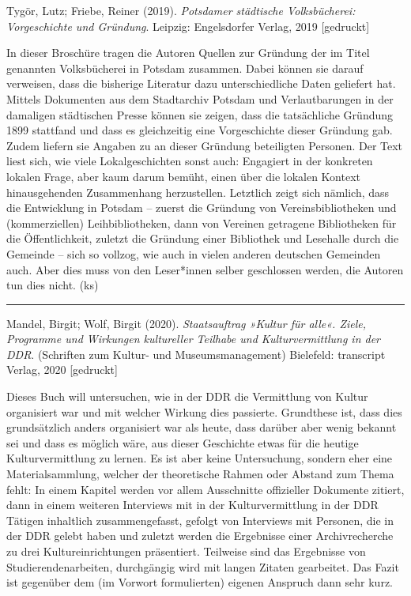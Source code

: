 \documentclass[a4paper,
fontsize=11pt,
oneside,
numbers=noperiodatend,
parskip=half-,
bibliography=totoc,
final
]{scrartcl}
\begin{document}
Tygör, Lutz; Friebe, Reiner (2019). \emph{Potsdamer städtische
Volksbücherei: Vorgeschichte und Gründung}. Leipzig: Engelsdorfer
Verlag, 2019 {[}gedruckt{]}

In dieser Broschüre tragen die Autoren Quellen zur Gründung der im Titel
genannten Volksbücherei in Potsdam zusammen. Dabei können sie darauf
verweisen, dass die bisherige Literatur dazu unterschiedliche Daten
geliefert hat. Mittels Dokumenten aus dem Stadtarchiv Potsdam und
Verlautbarungen in der damaligen städtischen Presse können sie zeigen,
dass die tatsächliche Gründung 1899 stattfand und dass es gleichzeitig
eine Vorgeschichte dieser Gründung gab. Zudem liefern sie Angaben zu an
dieser Gründung beteiligten Personen. Der Text liest sich, wie viele
Lokalgeschichten sonst auch: Engagiert in der konkreten lokalen Frage,
aber kaum darum bemüht, einen über die lokalen Kontext hinausgehenden
Zusammenhang herzustellen. Letztlich zeigt sich nämlich, dass die
Entwicklung in Potsdam -- zuerst die Gründung von Vereinsbibliotheken
und (kommerziellen) Leihbibliotheken, dann von Vereinen getragene
Bibliotheken für die Öffentlichkeit, zuletzt die Gründung einer
Bibliothek und Lesehalle durch die Gemeinde -- sich so vollzog, wie auch
in vielen anderen deutschen Gemeinden auch. Aber dies muss von den
Leser*innen selber geschlossen werden, die Autoren tun dies nicht. (ks)

\begin{center}\rule{0.5\linewidth}{0.5pt}\end{center}

Mandel, Birgit; Wolf, Birgit (2020). \emph{Staatsauftrag »Kultur für
alle«. Ziele, Programme und Wirkungen kultureller Teilhabe und
Kulturvermittlung in der DDR}. (Schriften zum Kultur- und
Museumsmanagement) Bielefeld: transcript Verlag, 2020 {[}gedruckt{]}

Dieses Buch will untersuchen, wie in der DDR die Vermittlung von Kultur
organisiert war und mit welcher Wirkung dies passierte. Grundthese ist,
dass dies grundsätzlich anders organisiert war als heute, dass darüber
aber wenig bekannt sei und dass es möglich wäre, aus dieser Geschichte
etwas für die heutige Kulturvermittlung zu lernen. Es ist aber keine
Untersuchung, sondern eher eine Materialsammlung, welcher der
theoretische Rahmen oder Abstand zum Thema fehlt: In einem Kapitel
werden vor allem Ausschnitte offizieller Dokumente zitiert, dann in
einem weiteren Interviews mit in der Kulturvermittlung in der DDR
Tätigen inhaltlich zusammengefasst, gefolgt von Interviews mit Personen,
die in der DDR gelebt haben und zuletzt werden die Ergebnisse einer
Archivrecherche zu drei Kultureinrichtungen präsentiert. Teilweise sind
das Ergebnisse von Studierendenarbeiten, durchgängig wird mit langen
Zitaten gearbeitet. Das Fazit ist gegenüber dem (im Vorwort
formulierten) eigenen Anspruch dann sehr kurz.
\end{document}
